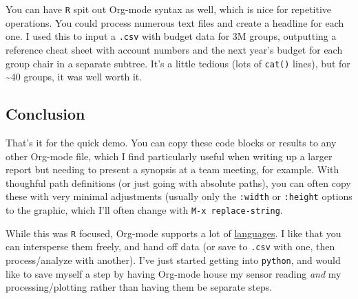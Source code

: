 \documentclass[11pt]{article}
\begin{document}
You can have \texttt{R} spit out Org-mode syntax as well, which is nice for repetitive
operations. You could process numerous text files and create a headline for each one. I
used this to input a \texttt{.csv} with budget data for 3M groups, outputting a reference cheat
sheet with account numbers and the next year's budget for each group chair in a separate
subtree. It's a little tedious (lots of \texttt{cat()} lines), but for \textasciitilde{}40 groups, it was well
worth it.

\subsection*{Conclusion}
\label{sec:orgheadline22}

That's it for the quick demo. You can copy these code blocks or results to any other
Org-mode file, which I find particularly useful when writing up a larger report but
needing to present a synopsis at a team meeting, for example. With thoughful path
definitions (or just going with absolute paths), you can often copy these with very
minimal adjustments (usually only the \texttt{:width} or \texttt{:height} options to the graphic, which
I'll often change with \texttt{M-x replace-string}.

While this was \texttt{R} focused, Org-mode supports a lot of \href{http://orgmode.org/worg/org-contrib/babel/languages.html}{languages}. I like that you can
intersperse them freely, and hand off data (or save to \texttt{.csv} with one, then
process/analyze with another). I've just started getting into \texttt{python}, and would like to
save myself a step by having Org-mode house my sensor reading \emph{and} my processing/plotting
rather than having them be separate steps.
\end{document}
